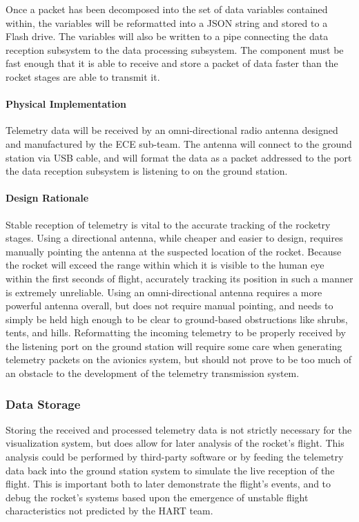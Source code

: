 \documentclass[journal,10pt,onecolumn,compsoc]{IEEEtran}
\begin{document}
				\noindent Once a packet has been decomposed into the set of data variables contained within, the variables will be reformatted into a JSON string and stored to a Flash drive.
				The variables will also be written to a pipe connecting the data reception subsystem to the data processing subsystem.
				The component must be fast enough that it is able to receive and store a packet of data faster than the rocket stages are able to transmit it.

			\paragraph{Physical Implementation}
				\noindent Telemetry data will be received by an omni-directional radio antenna designed and manufactured by the ECE sub-team.
				The antenna will connect to the ground station via USB cable, and will format the data as a packet addressed to the port the data reception subsystem is listening to on the ground station.

			\paragraph{Design Rationale}
				\noindent Stable reception of telemetry is vital to the accurate tracking of the rocketry stages.
				Using a directional antenna, while cheaper and easier to design, requires manually pointing the antenna at the suspected location of the rocket.
				Because the rocket will exceed the range within which it is visible to the human eye within the first seconds of flight, accurately tracking its position in such a manner is extremely unreliable.
				Using an omni-directional antenna requires a more powerful antenna overall, but does not require manual pointing, and needs to simply be held high enough to be clear to ground-based obstructions like shrubs, tents, and hills.
				Reformatting the incoming telemetry to be properly received by the listening port on the ground station will require some care when generating telemetry packets on the avionics system, but should not prove to be too much of an obstacle to the development of the telemetry transmission system.

		\subsubsection{Data Storage}
			\noindent Storing the received and processed telemetry data is not strictly necessary for the visualization system, but does allow for later analysis of the rocket's flight.
			This analysis could be performed by third-party software or by feeding the telemetry data back into the ground station system to simulate the live reception of the flight.
			This is important both to later demonstrate the flight's events, and to debug the rocket's systems based upon the emergence of unstable flight characteristics not predicted by the HART team.
\end{document}
